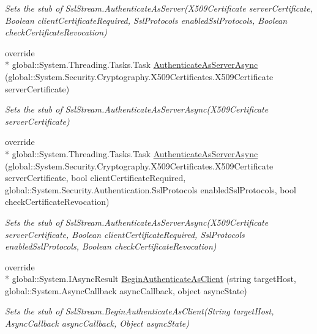 \begin{DoxyCompactItemize}
\begin{DoxyCompactList}\small\item\em Sets the stub of Ssl\-Stream.\-Authenticate\-As\-Server(\-X509\-Certificate server\-Certificate, Boolean client\-Certificate\-Required, Ssl\-Protocols enabled\-Ssl\-Protocols, Boolean check\-Certificate\-Revocation)\end{DoxyCompactList}\item 
override \\*
global\-::\-System.\-Threading.\-Tasks.\-Task \hyperlink{class_system_1_1_net_1_1_security_1_1_fakes_1_1_stub_ssl_stream_a353a5b4922dc8883af5088cd4473fa88}{Authenticate\-As\-Server\-Async} (global\-::\-System.\-Security.\-Cryptography.\-X509\-Certificates.\-X509\-Certificate server\-Certificate)
\begin{DoxyCompactList}\small\item\em Sets the stub of Ssl\-Stream.\-Authenticate\-As\-Server\-Async(\-X509\-Certificate server\-Certificate)\end{DoxyCompactList}\item 
override \\*
global\-::\-System.\-Threading.\-Tasks.\-Task \hyperlink{class_system_1_1_net_1_1_security_1_1_fakes_1_1_stub_ssl_stream_ab36cd186cd7e7382f2032e363a2e976a}{Authenticate\-As\-Server\-Async} (global\-::\-System.\-Security.\-Cryptography.\-X509\-Certificates.\-X509\-Certificate server\-Certificate, bool client\-Certificate\-Required, global\-::\-System.\-Security.\-Authentication.\-Ssl\-Protocols enabled\-Ssl\-Protocols, bool check\-Certificate\-Revocation)
\begin{DoxyCompactList}\small\item\em Sets the stub of Ssl\-Stream.\-Authenticate\-As\-Server\-Async(\-X509\-Certificate server\-Certificate, Boolean client\-Certificate\-Required, Ssl\-Protocols enabled\-Ssl\-Protocols, Boolean check\-Certificate\-Revocation)\end{DoxyCompactList}\item 
override \\*
global\-::\-System.\-I\-Async\-Result \hyperlink{class_system_1_1_net_1_1_security_1_1_fakes_1_1_stub_ssl_stream_a23fce8602e15cda4dea2580e7da2f15e}{Begin\-Authenticate\-As\-Client} (string target\-Host, global\-::\-System.\-Async\-Callback async\-Callback, object async\-State)
\begin{DoxyCompactList}\small\item\em Sets the stub of Ssl\-Stream.\-Begin\-Authenticate\-As\-Client(\-String target\-Host, Async\-Callback async\-Callback, Object async\-State)\end{DoxyCompactList}\item 

\end{DoxyCompactItemize}

